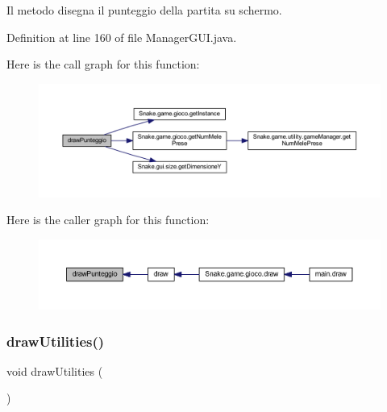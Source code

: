 Il metodo disegna il punteggio della partita su schermo. 



Definition at line 160 of file Manager\+G\+U\+I.\+java.

Here is the call graph for this function\+:
\nopagebreak
\begin{figure}[H]
\begin{center}
\leavevmode
\includegraphics[width=350pt]{class_snake_1_1gui_1_1_manager_g_u_i_ab1a7af3f7073e8975696c4806e9194ef_cgraph}
\end{center}
\end{figure}
Here is the caller graph for this function\+:
\nopagebreak
\begin{figure}[H]
\begin{center}
\leavevmode
\includegraphics[width=350pt]{class_snake_1_1gui_1_1_manager_g_u_i_ab1a7af3f7073e8975696c4806e9194ef_icgraph}
\end{center}
\end{figure}
\mbox{\label{class_snake_1_1gui_1_1_manager_g_u_i_ab4847130cdcf549a9cb479df18417787}} 
\subsubsection{\texorpdfstring{draw\+Utilities()}{drawUtilities()}}
{\footnotesize\ttfamily void draw\+Utilities (\begin{DoxyParamCaption}{ }\end{DoxyParamCaption})\hspace{0.3cm}{\ttfamily [private]}}




